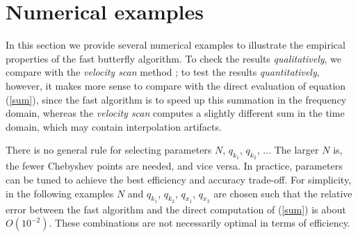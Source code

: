\begin{comment}
\new{It is also worthwhile (maybe not fair though) to compare our method with the time-invariant transforms, since the parabolic or linear Radon transforms are the main-stream applications in the current data processing practice. Suppose that, given data $d(t,h)$, our goal is to find model $m_*(\tau,p)$ such that $\displaystyle m_*=\text{arg}\min_{m} \|Lm-d\|_2$, where $L$ is the adjoint of the Radon transform. The method for time-invariant transforms is to break this problem into several small problems in the frequency domain and minimize $\|\hat{L}_{f}\hat{m}_f-\hat{d}_f\|_2$ for each frequency $f$. Therefore the total cost is roughly $O(N_f N_{\text{iter}}N_hN_p)$, provided $N_{\text{iter}}$ iterations are needed in a CG type method. On the other hand, our algorithm accelerates the evaluation of the original operator $L$, thus requires $O(N_{\text{iter}} N^2 \log N)$ operations in a least squares minimization.}
\end{comment}



\section{Numerical examples}

In this section we provide several numerical examples to illustrate the empirical properties of the fast butterfly algorithm. To check the results {\it qualitatively}, we compare with the {\it velocity scan} method ; to test the results {\it quantitatively}, however, it makes more sense to compare with the direct evaluation of equation (\ref{sum}), since the fast algorithm is to speed up this summation in the frequency domain, whereas the {\it velocity scan} computes a slightly different sum in the time domain, which may contain interpolation artifacts.

There is no general rule for selecting parameters $N$, $q_{k_1}$, $q_{k_2}$, ... The larger $N$ is, the fewer Chebyshev points are needed, and vice versa. In practice, parameters can be tuned to achieve the best efficiency and accuracy trade-off. For simplicity, in the following examples $N$ and $q_{k_1}$, $q_{k_2}$, $q_{x_1}$, $q_{x_2}$ are chosen such that the relative error between the fast algorithm and the direct computation of (\ref{sum}) is about $O(10^{-2})$. These combinations are not necessarily optimal in terms of efficiency.

